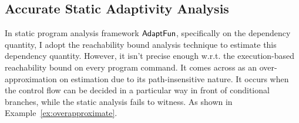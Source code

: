 \subsection{Accurate Static Adaptivity Analysis}
\label{subsec:furthers-reachability}
In static program analysis framework $\textsf{AdaptFun}$, specifically on the dependency quantity, 
I adopt the reachability bound analysis technique to estimate this dependency quantity.
However, it isn't precise enough w.r.t. the execution-based reachability bound on every program command.
It comes across as an over-approximation on estimation due to its path-insensitive nature. 
It occurs when the control flow can be decided in a particular way in front of conditional branches, 
while the static analysis fails to witness. 
As shown in Example~\ref{ex:overapproximate}.


